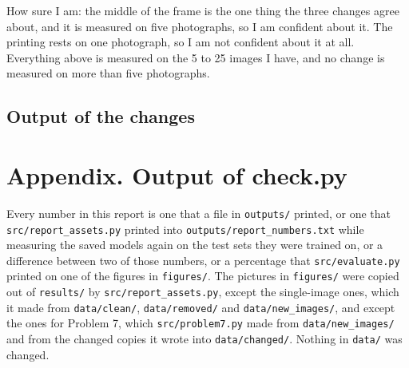 \documentclass[11pt]{article}
\begin{document}
How sure I am: the middle of the frame is the one thing the three changes agree
about, and it is measured on five photographs, so I am confident about it. The
printing rests on one photograph, so I am not confident about it at all.
Everything above is measured on the 5 to 25 images I have, and no change is
measured on more than five photographs.

\subsection*{Output of the changes}

\section*{Appendix. Output of check.py}

Every number in this report is one that a file in \texttt{outputs/} printed,
or one that \texttt{src/report\_assets.py} printed into
\texttt{outputs/report\_numbers.txt} while measuring the saved models again on
the test sets they were trained on, or a difference between two of those
numbers, or a percentage that \texttt{src/evaluate.py} printed on one of the
figures in \texttt{figures/}. The pictures in \texttt{figures/} were
copied out of \texttt{results/} by \texttt{src/report\_assets.py}, except the
single-image ones, which it made from \texttt{data/clean/},
\texttt{data/removed/} and \texttt{data/new\_images/}, and except the ones for
Problem 7, which \texttt{src/problem7.py} made from \texttt{data/new\_images/}
and from the changed copies it wrote into \texttt{data/changed/}. Nothing in
\texttt{data/} was changed.
\end{document}
